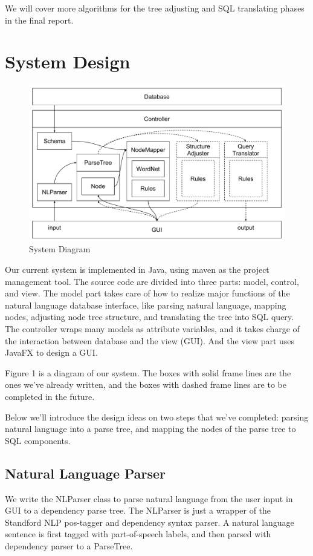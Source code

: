 \documentclass[twocolumn]{article}
\begin{document}
We will cover more algorithms for the tree adjusting and SQL translating phases in the final report.  

\section{System Design}

\begin{figure}[ht]
  \centerline{\includegraphics[width=0.8\linewidth]{figures/nlidb_system_diagram.pdf}}
  \caption{System Diagram}
\end{figure}

Our current system is implemented in Java, using maven as the project management tool. The source code are divided into three parts: model, control, and view. The model part takes care of how to realize major functions of the natural language database interface, like parsing natural language, mapping nodes, adjusting node tree structure, and translating the tree into SQL query. The controller wraps many models as attribute variables, and it takes charge of the interaction between database and the view (GUI). And the view part uses JavaFX to design a GUI.

Figure 1 is a diagram of our system. The boxes with solid frame lines are the ones we've already written, and the boxes with dashed frame lines are to be completed in the future. 

Below we’ll introduce the design ideas on two steps that we’ve completed: parsing natural language into a parse tree, and mapping the nodes of the parse tree to SQL components.

\subsection{Natural Language Parser}
We write the NLParser class to parse natural language from the user input in GUI to a dependency parse tree. The NLParser is just a wrapper of the Standford NLP pos-tagger and dependency syntax parser. A natural language sentence is first tagged with part-of-speech labels, and then parsed with dependency parser to a ParseTree.
\end{document}
